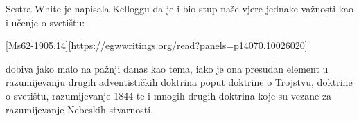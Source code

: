 Sestra White je napisala Kelloggu da je  i  bio stup naše vjere jednake važnosti kao i učenje o svetištu:

[Ms62-1905.14][https://egwwritings.org/read?panels=p14070.10026020]

 dobiva jako malo na pažnji danas kao tema, iako je ona presudan element u razumijevanju drugih adventističkih doktrina poput doktrine o Trojstvu, doktrine o svetištu, razumijevanje 1844-te i mnogih drugih doktrina koje su vezane za razumijevanje Nebeskih stvarnosti.

